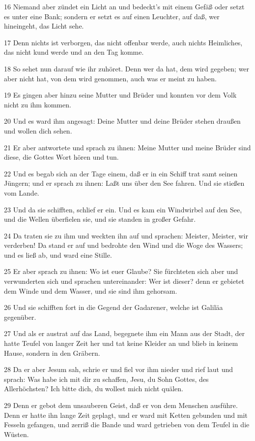 \par 16 Niemand aber zündet ein Licht an und bedeckt's mit einem Gefäß oder setzt es unter eine Bank; sondern er setzt es auf einen Leuchter, auf daß, wer hineingeht, das Licht sehe.
\par 17 Denn nichts ist verborgen, das nicht offenbar werde, auch nichts Heimliches, das nicht kund werde und an den Tag komme.
\par 18 So sehet nun darauf wie ihr zuhöret. Denn wer da hat, dem wird gegeben; wer aber nicht hat, von dem wird genommen, auch was er meint zu haben.
\par 19 Es gingen aber hinzu seine Mutter und Brüder und konnten vor dem Volk nicht zu ihm kommen.
\par 20 Und es ward ihm angesagt: Deine Mutter und deine Brüder stehen draußen und wollen dich sehen.
\par 21 Er aber antwortete und sprach zu ihnen: Meine Mutter und meine Brüder sind diese, die Gottes Wort hören und tun.
\par 22 Und es begab sich an der Tage einem, daß er in ein Schiff trat samt seinen Jüngern; und er sprach zu ihnen: Laßt uns über den See fahren. Und sie stießen vom Lande.
\par 23 Und da sie schifften, schlief er ein. Und es kam ein Windwirbel auf den See, und die Wellen überfielen sie, und sie standen in großer Gefahr.
\par 24 Da traten sie zu ihm und weckten ihn auf und sprachen: Meister, Meister, wir verderben! Da stand er auf und bedrohte den Wind und die Woge des Wassers; und es ließ ab, und ward eine Stille.
\par 25 Er aber sprach zu ihnen: Wo ist euer Glaube? Sie fürchteten sich aber und verwunderten sich und sprachen untereinander: Wer ist dieser? denn er gebietet dem Winde und dem Wasser, und sie sind ihm gehorsam.
\par 26 Und sie schifften fort in die Gegend der Gadarener, welche ist Galiläa gegenüber.
\par 27 Und als er austrat auf das Land, begegnete ihm ein Mann aus der Stadt, der hatte Teufel von langer Zeit her und tat keine Kleider an und blieb in keinem Hause, sondern in den Gräbern.
\par 28 Da er aber Jesum sah, schrie er und fiel vor ihm nieder und rief laut und sprach: Was habe ich mit dir zu schaffen, Jesu, du Sohn Gottes, des Allerhöchsten? Ich bitte dich, du wollest mich nicht quälen.
\par 29 Denn er gebot dem unsauberen Geist, daß er von dem Menschen ausführe. Denn er hatte ihn lange Zeit geplagt, und er ward mit Ketten gebunden und mit Fesseln gefangen, und zerriß die Bande und ward getrieben von dem Teufel in die Wüsten.
